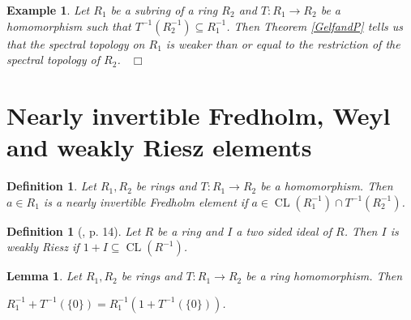 \documentclass[12pt, oneside]{book}
\newtheorem{lemma}[theorem]{Lemma}
\newtheorem{example}[theorem]{Example}
\newtheorem{definition}[theorem]{Definition}
\newcommand{\qed}{\hfill ~$\Box$\\}
\def\CL{\operatorname{CL}}
\begin{document}
\smallskip

\begin{example}
\normalfont
\noindent  Let $R_1$ be a subring of a ring $R_2$ and $T : R_1 \rightarrow R_2$ be a homomorphism 
such that $T^{-1}(R_2^{-1}) \subseteq R_1^{-1}$. Then Theorem \ref{GelfandP} tells us that the spectral topology on $R_1$ is weaker than or equal to the restriction of the spectral topology of $R_2$.
\qed
\end{example}





\section{Nearly invertible Fredholm, Weyl \newline and weakly Riesz elements}

\begin{definition}
\normalfont
\noindent Let $R_1, R_2$ be rings and $T:R_1 \to R_2$ be a homomorphism. Then $a \in R_1$ is a 
{\sl nearly invertible Fredholm} element if  $a \in \CL(R_1^{-1}) \cap T^{-1}(R_2^{-1})$.
\end{definition}

\begin{definition}[{\cite{DH}, p. 14}] 
\normalfont
\noindent Let $R$ be a ring and $I$ a two sided ideal of $R$. Then $I$ is {\sl weakly Riesz} 
if  $1+I \subseteq \CL(R^{-1})$.

\end{definition}

\begin{lemma} 
\normalfont
\noindent Let $R_1, R_2$ be rings and  $T : R_1 \to R_2$ be a ring homomorphism. Then
\begin{center} 
 $R_1^{-1} + T^{-1}(\{0\}) = R_1^{-1}(1+T^{-1}(\{0\}))$.
\end{center}
\end{lemma}
\end{document}
